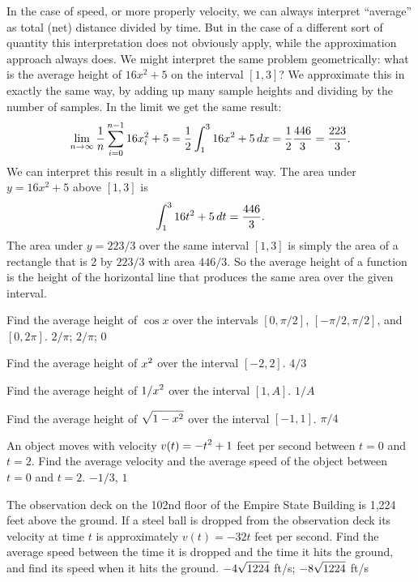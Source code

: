 In the case of speed, or more properly velocity, we can always
interpret ``average'' as total (net) distance divided by time. But in
the case of a different sort of quantity this interpretation does not
obviously apply, while the approximation approach always does. We might
interpret the same problem geometrically: what is the average height
of $16x^2+5$ on the interval $[1,3]$? We approximate this in exactly
the same way, by adding up many sample heights and dividing by the
number of samples. In the limit we get the same result:
$$
  \lim_{n\to\infty}{1\over n}\sum_{i=0}^{n-1} 16x_i^2+5=
  {1\over 2}\int_1^3 16x^2+5\,dx={1\over 2}{446\over 3}={223\over 3}.
$$
We can interpret this result in a slightly different way. The area
under $y=16x^2+5$ above $[1,3]$ is
$$\int_1^3 16t^2+5\,dt={446\over 3}.$$ 
The area under $y=223/3$ over the same interval $[1,3]$ is simply the
area of a rectangle that is 2 by $223/3$ with area $446/3$. So the
average height of a function is the height of the horizontal line that
produces the same area over the given interval.

\exercises

\exercise Find the average height of $\cos x$ over the intervals
$[0,\pi/2]$, $[-\pi/2,\pi/2]$, and $[0,2\pi]$.
\answer $2/\pi$; $2/\pi$; $0$
\endanswer
\endexercise

\exercise Find the average height of $\displaystyle x^2$ over the interval
$[-2,2]$.
\answer $4/3$
\endanswer
\endexercise

\exercise Find the average height of $\displaystyle 1/x^2$ over the interval
$[1,A]$.
\answer $1/A$
\endanswer
\endexercise

\exercise Find the average height of $\displaystyle \sqrt{1-x^2}$ over the interval
$[-1,1]$.
\answer $\pi/4$
\endanswer
\endexercise

\exercise An object moves with velocity $\displaystyle v(t)=-t^2+1$ feet per second
between $t=0$ and $t=2$. Find the average velocity and the average
speed of the object between $t=0$ and $t=2$.
\answer $-1/3$, $1$
\endanswer
\endexercise

\exercise The observation deck on the 102nd floor of the Empire State Building
is 1,224 feet above the ground. If a steel ball is dropped from the
observation deck its velocity at time $t$ is approximately $v(t)=-32t$
feet per second. Find the average speed between the time it is dropped
and the time it hits the ground, and find its speed when it hits the
ground.
\answer $\displaystyle -4\sqrt{1224}$ ft/s; $\displaystyle -8\sqrt{1224}$ ft/s
\endanswer
\endexercise

\endexercises

